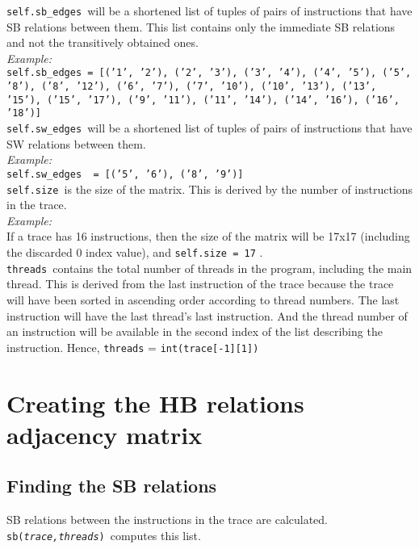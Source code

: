 \documentclass{article}
\newcommand{\var}[1]{\color{OliveGreen} \texttt{#1}\color{black}}
\newcommand{\fun}[2]{\color{Sepia}\texttt{#1(\color{Gray}\textit{#2}\color{Sepia})}\color{black}}
\newcommand{\varinfo}[1]{\scriptsize \texttt{#1} \normalsize}
\begin{document}
\var{self.sb\_edges }will be a shortened list of tuples of pairs of instructions that have SB relations between them. This list contains only the immediate SB relations and not the transitively obtained ones.\\
\textit{Example:}\\
\var{self.sb\_edges}\varinfo{ = [('1', '2'), ('2', '3'), ('3', '4'), ('4', '5'), ('5', '8'), ('8', '12'), ('6', '7'), ('7', '10'), ('10', '13'), ('13', '15'), ('15', '17'), ('9', '11'), ('11', '14'), ('14', '16'), ('16', '18')]
}\\

\var{self.sw\_edges }will be a shortened list of tuples of pairs of instructions that have SW relations between them.\\
\textit{Example:}\\
\var{self.sw\_edges }\varinfo{ = [('5', '6'), ('8', '9')]}\\

\var{self.size }is the size of the matrix. This is derived by the number of instructions in the trace.\\
\textit{Example:}\\
If a trace has 16 instructions, then the size of the matrix will be 17x17 (including the discarded 0 index value), and \var{self.size }\varinfo{= 17}.\\

\var{threads }contains the total number of threads in the program, including the main thread. This is derived from the last instruction of the trace because the trace will have been sorted in ascending order according to thread numbers. The last instruction will have the last thread's last instruction. And the thread number of an instruction will be available in the second index of the list describing the instruction. Hence, \var{threads} = \varinfo{int(trace[-1][1])}\\

\section{Creating the HB relations adjacency matrix}
\subsection{Finding the SB relations}
SB relations between the instructions in the trace are calculated.\\
\fun{sb}{trace,threads}\ computes this list.\\
\end{document}
